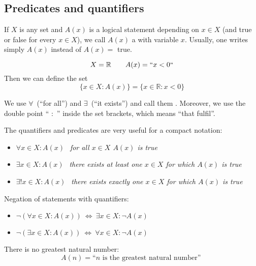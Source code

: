 
\subsection*{Predicates and quantifiers}

\begin{Definition}[Predicate]
If $X$ is any set and $A(x)$ is a logical statement depending on $x \in X$ (and true or false for every $x\in X$),
we call $A(x)$ a  with variable $x$.
Usually, one writes simply $A(x)$ instead of $A(x)=$ true. 
\end{Definition}

\begin{example}{}
\[
 X=\mathbb{R}\qquad   A(x) = ``x < 0``
\]
Then we can define the set
	$$
	\{ x \in X : A(x) \}	= \{ x \in \mathbb{R} : x < 0 \}
	$$
\end{example}

\begin{Definition}
We use
$\forall$~(``for all'') and $\exists$~(``it exists'')
and call them .
Moreover, we use
the double point `` $:$ '' inside the set brackets, which means
``that fulfil''.  
\end{Definition}


The quantifiers and predicates are very useful for a compact notation:
\begin{itemize}
 \item $\forall x \in X : A(x)~~$  \emph{for all $x\in X$ $A(x)$ is true}
 \item $\exists x \in X : A(x)~~$  \emph{there exists at least one $x\in X$ for which $A(x)$ is true}
 \item $\exists! x \in X : A(x)~~$ \emph{there exists exactly one $x\in X$ for which $A(x)$ is true}
\end{itemize}

Negation of statements with quantifiers:
\begin{itemize}
 \item $\neg (\forall x \in X : A(x)) ~\Leftrightarrow~ \exists x \in X : \neg A(x)$
 \item $\neg (\exists x \in X : A(x)) ~\Leftrightarrow~ \forall x \in X : \neg A(x)$
\end{itemize}

\begin{example}
There is no greatest natural number:
\[
 A(n) = \text{``}n \mbox{ is the greatest natural number'' }
\]
\end{example}

